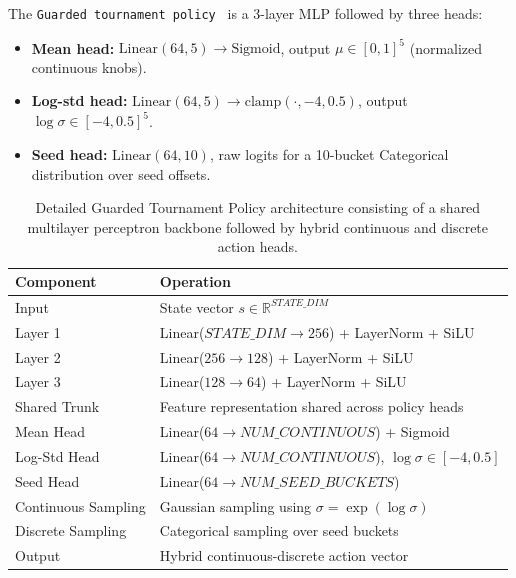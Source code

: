 The \texttt{Guarded tournament policy } is a 3-layer MLP
followed by three heads:
\begin{itemize}[leftmargin=1.5em,itemsep=1pt,topsep=2pt]
  \item \textbf{Mean head:} $\text{Linear}(64, 5) \to \text{Sigmoid}$,
        output $\mu \in [0,1]^5$ (normalized continuous knobs).
  \item \textbf{Log-std head:} $\text{Linear}(64, 5) \to
        \text{clamp}(\cdot, -4, 0.5)$, output $\log\sigma \in [-4, 0.5]^5$.
  \item \textbf{Seed head:} $\text{Linear}(64, 10)$, raw logits for
        a 10-bucket Categorical distribution over seed offsets.
\end{itemize}
\begin{table}[t]
\centering
\small
\begin{tabular}{ll}
\toprule
\textbf{Component} & \textbf{Operation} \\
\midrule

Input &
State vector $s \in \mathbb{R}^{STATE\_DIM}$
\\

Layer 1 &
Linear($STATE\_DIM \rightarrow 256$) + LayerNorm + SiLU
\\

Layer 2 &
Linear($256 \rightarrow 128$) + LayerNorm + SiLU
\\

Layer 3 &
Linear($128 \rightarrow 64$) + LayerNorm + SiLU
\\

Shared Trunk &
Feature representation shared across policy heads
\\

Mean Head &
Linear($64 \rightarrow NUM\_CONTINUOUS$) + Sigmoid
\\

Log-Std Head &
Linear($64 \rightarrow NUM\_CONTINUOUS$),
$\log \sigma \in [-4,0.5]$
\\

Seed Head &
Linear($64 \rightarrow NUM\_SEED\_BUCKETS$)
\\

Continuous Sampling &
Gaussian sampling using
$\sigma=\exp(\log \sigma)$
\\

Discrete Sampling &
Categorical sampling over seed buckets
\\

Output &
Hybrid continuous-discrete action vector
\\

\bottomrule
\end{tabular}

\caption{
Detailed Guarded Tournament Policy architecture consisting of a shared multilayer perceptron
backbone followed by hybrid continuous and discrete action heads.
}

\label{tab:tspo_policy}
\end{table}
